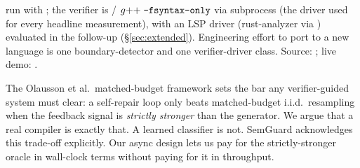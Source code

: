 \begin{enumerate}[itemsep=2pt,topsep=2pt]
  \citep{vllm2023} run with ; the
  verifier is  /
  $g{+}{+}\;\texttt{-fsyntax-only}$ via subprocess (the driver used
  for every headline measurement), with an LSP driver
  (rust-analyzer via 
  \citep{agrawal2023monitor,multilspy}) evaluated in the follow-up
  (\S\ref{sec:extended}). Engineering effort
  to port to a new language is one boundary-detector and one
  verifier-driver class. Source:
  \href{https://github.com/leobwang/soundcode}%
       {};
  live demo:
  \href{https://soundcode-demo.psixyzt.com}%
       {}
  \citep{soundcode2025github}.
\end{enumerate}

The Olausson et al.\ matched-budget framework
\citep{olausson2024selfrepair} sets the bar any verifier-guided
system must clear: a self-repair loop only beats matched-budget
i.i.d.\ resampling when the feedback signal is \emph{strictly
stronger} than the generator. We argue that a real compiler is
exactly that. A learned classifier is not. SemGuard
\citep{wang2025semguard} acknowledges this trade-off explicitly. Our
async design lets us pay for the strictly-stronger oracle in
wall-clock terms without paying for it in throughput.
